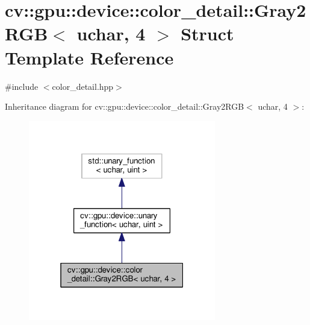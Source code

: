 \hypertarget{structcv_1_1gpu_1_1device_1_1color__detail_1_1Gray2RGB_3_01uchar_00_014_01_4}{\section{cv\-:\-:gpu\-:\-:device\-:\-:color\-\_\-detail\-:\-:Gray2\-R\-G\-B$<$ uchar, 4 $>$ Struct Template Reference}
\label{structcv_1_1gpu_1_1device_1_1color__detail_1_1Gray2RGB_3_01uchar_00_014_01_4}
}


{\ttfamily \#include $<$color\-\_\-detail.\-hpp$>$}



Inheritance diagram for cv\-:\-:gpu\-:\-:device\-:\-:color\-\_\-detail\-:\-:Gray2\-R\-G\-B$<$ uchar, 4 $>$\-:\nopagebreak
\begin{figure}[H]
\begin{center}
\leavevmode
\includegraphics[width=232pt]{structcv_1_1gpu_1_1device_1_1color__detail_1_1Gray2RGB_3_01uchar_00_014_01_4__inherit__graph}
\end{center}
\end{figure}


